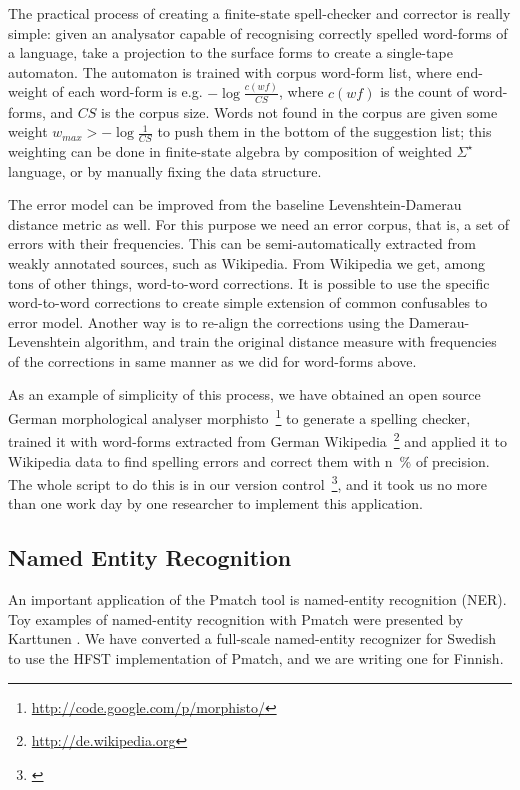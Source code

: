 \documentclass{llncs}
\begin{document}
The practical process of creating a finite-state spell-checker and corrector
is really simple: given an analysator capable of recognising correctly spelled
word-forms of a language, take a projection to the surface forms to create a
single-tape automaton. The automaton is trained with corpus word-form list, 
where end-weight of each word-form is e.g. $-\log\frac{c(wf)}{CS}$, where 
$c(wf)$ is the count of word-forms, and $CS$ is the corpus size. Words not
found in the corpus are given some weight $w_{max} > -\log\frac{1}{CS}$ to
push them in the bottom of the suggestion list; this weighting can be done
in finite-state algebra by composition of weighted $\Sigma^{\star}$ language,
or by manually fixing the data structure.

The error model can be improved from the baseline Levenshtein-Damerau distance
metric as well. For this purpose we need an error corpus, that is, a set of
errors with their frequencies. This can be semi-automatically extracted from
weakly annotated sources, such as Wikipedia. From Wikipedia we get, among tons
of other things, word-to-word corrections. It is possible to use the specific
word-to-word corrections to create simple extension of common confusables to
error model. Another way is to re-align the corrections using the
Damerau-Levenshtein algorithm, and train the original distance measure with
frequencies of the corrections in same manner as we did for word-forms above.

As an example of simplicity of this process, we have obtained an open source
German morphological analyser
morphisto~\footnote{\url{http://code.google.com/p/morphisto/}} to generate a
spelling checker, trained it with word-forms extracted from German
Wikipedia~\footnote{\url{http://de.wikipedia.org}} and applied it to Wikipedia
data to find spelling errors and correct them with n~\% of precision. The whole
script to do this is in our version control~\footnote{\url{}}, and it took us
no more than one work day by one researcher to implement this application.

\subsection{Named Entity Recognition}

An important application of the Pmatch tool is named-entity
recognition (NER). Toy examples of named-entity recognition with
Pmatch were presented by Karttunen \cite{karttunen/2011}. We have
converted a full-scale named-entity recognizer for Swedish to use the
HFST implementation of Pmatch, and we are writing one for Finnish.
\end{document}
